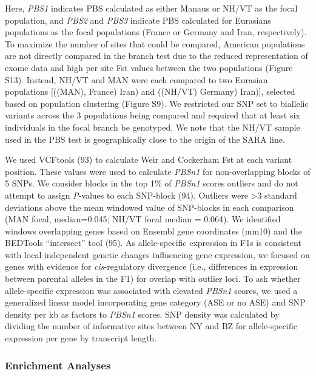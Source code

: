 \documentclass[9pt,twocolumn,twoside,lineno]{pnas-new}
\begin{document}
Here, \emph{PBS1} indicates PBS calculated as either Manaus or NH/VT as
the focal population, and \emph{PBS2} and \emph{PBS3} indicate PBS
calculated for Eurasians populations as the focal populations (France or
Germany and Iran, respectively). To maximize the number of sites that
could be compared, American populations are not directly compared in the
branch test due to the reduced representation of exome data and high per
site Fst values between the two populations (Figure S13). Instead, NH/VT
and MAN were each compared to two Eurasian populations {[}((MAN),
France) Iran) and ((NH/VT) Germany) Iran){]}, selected based on
population clustering (Figure S9). We restricted our SNP set to
biallelic variants across the 3 populations being compared and required
that at least six individuals in the focal branch be genotyped. We note
that the NH/VT sample used in the PBS test is geographically close to
the origin of the SARA line.

We used VCFtools (93) to calculate Weir and Cockerham Fst at each
variant position. These values were used to calculate \emph{PBSn1} for
non-overlapping blocks of 5 SNPs. We consider blocks in the top 1\% of
\emph{PBSn1} scores outliers and do not attempt to assign
\emph{P}-values to each SNP-block (94). Outliers were \textgreater3
standard deviations above the mean windowed value of SNP-blocks in each
comparison (MAN focal, median=0.045; NH/VT focal median = 0.064). We
identified windows overlapping genes based on Ensembl gene coordinates
(mm10) and the BEDTools ``intersect'' tool (95). As allele-specific
expression in F1s is consistent with local independent genetic changes
influencing gene expression, we focused on genes with evidence for
\emph{cis}-regulatory divergence (i.e., differences in expression
between parental alleles in the F1) for overlap with outlier loci. To
ask whether allele-specific expression was associated with elevated
\emph{PBSn1} scores, we used a generalized linear model incorporating
gene category (ASE or no ASE) and SNP density per kb as factors to
\emph{PBSn1} scores. SNP density was calculated by dividing the number
of informative sites between NY and BZ for allele-specific expression
per gene by transcript length.

\hypertarget{enrichment-analyses}{%
\subsubsection*{Enrichment Analyses}\label{enrichment-analyses}}
\end{document}
